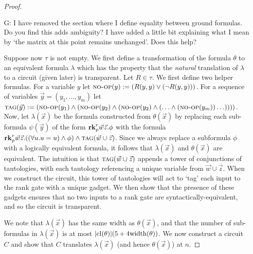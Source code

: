 \documentclass[../paper.tex]{subfiles}
\begin{document}
\begin{proof}
  \begin{remark}
    G: I have removed the section where I define equality between ground
    formulas. Do you find this adds ambiguity? I have added a little bit
    explaining what I mean by `the matrix at this point remains unchanged'. Does
    this help?
  \end{remark}
  
  Suppose now $\tau$ is not empty.  We first define a transformation
  of the formula $\theta$ to an equivalent formula $\lambda$ which has
  the property that the \emph{natural} translation of $\lambda$ to a
  circuit (given later) is transparent.
Let $R \in \tau$.  We first define two helper
  formulas. For a variable $y$ let ${\normalfont\textsc{no-op}}(y) := (R(y, y) \lor (\neg R(y,
  y)))$. For a sequence of variables $\vec{y} = (y_1, \ldots, y_m)$ let
  ${\normalfont\textsc{tag}} (\vec{y}) := ({\normalfont\textsc{no-op}}(y_1) \land ({\normalfont\textsc{no-op}}(y_2) \land (
  {\normalfont\textsc{no-op}}(y_2) \land ( \ldots \land ({\normalfont\textsc{no-op}}(y_m)) \ldots))))$.
  Now, let  $\lambda (\vec{x})$ be the formula constructed from $\theta(\vec{x})$ by
  replacing each sub-formula $\psi(\vec{y})$ of the form $\text{\textbf{rk}}^r_p \vec{w}
  \vec{z} . \phi$ with the formula $\text{\textbf{rk}}^r_p \vec{w}\vec{z} . ((\forall u . u =
  u) \land \phi) \land {\normalfont\textsc{tag}}(\vec{w} \cup \vec{z})$.  Since we
  always replace a subformula $\phi$ with a logically equivalent
  formula, it follows that $\lambda
  (\vec{x})$ and $\theta (\vec{x})$ are equivalent. The intuition is that
  ${\normalfont\textsc{tag}}(\vec{w} \cup \vec{z})$ appends a tower of conjunctions of
  tautologies, with each tautology referencing a unique variable from $\vec{w}
  \cup \vec{z}$. When we construct the circuit, this tower of tautologies will
  act to `tag' each input to the rank gate with a unique gadget. We then show
  that the presence of these gadgets ensures that no two inputs to a rank gate
  are syntactically-equivalent, and so the circuit is
  transparent.
  



  We note that $\lambda(\vec{x})$ has the same width as $\theta(\vec{x})$, and
  that the number of sub-formulas in $\lambda(\vec{x})$ is at most $\vert
  \mathrm{cl}(\theta) \vert (5 + 4\mathrm{width}(\theta))$. We now construct a circuit $C$ and
  show that $C$ translates $\lambda(\vec{x})$ (and hence $\theta(\vec{x})$) at
  $n$.


\end{proof}
\end{document}

